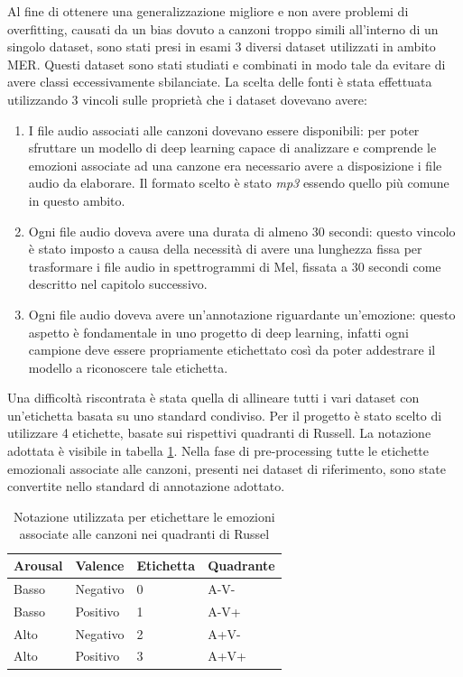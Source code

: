 \documentclass[11pt]{report}
\begin{document}
Al fine di ottenere una generalizzazione migliore e non avere problemi di overfitting, causati da un bias dovuto a canzoni troppo simili all'interno di un singolo dataset, sono stati presi in esami 3 diversi dataset utilizzati in ambito MER. Questi dataset sono stati studiati e combinati in modo tale da evitare di avere classi eccessivamente sbilanciate. La scelta delle fonti è stata effettuata utilizzando 3 vincoli sulle proprietà che i dataset dovevano avere:
\begin{enumerate}

    \item I file audio associati alle canzoni dovevano essere disponibili: per poter sfruttare un modello di deep learning capace di analizzare e comprende le emozioni associate ad una canzone era necessario avere a disposizione i file audio da elaborare. Il formato scelto è stato \textit{mp3} essendo quello più comune in questo ambito.
    
    \item Ogni file audio doveva avere una durata di almeno 30 secondi: questo vincolo è stato imposto a causa della necessità di avere una lunghezza fissa per trasformare i file audio in spettrogrammi di Mel, fissata a 30 secondi come descritto nel capitolo successivo.
    
    \item Ogni file audio doveva avere un'annotazione riguardante un'emozione: questo aspetto è fondamentale in uno progetto di deep learning, infatti ogni campione deve essere propriamente etichettato così da poter addestrare il modello a riconoscere tale etichetta.
    
\end{enumerate}



Una difficoltà riscontrata è stata quella di allineare tutti i vari dataset con un'etichetta basata su uno standard condiviso. Per il progetto è stato scelto di utilizzare 4 etichette, basate sui rispettivi quadranti di Russell. La notazione adottata è visibile in tabella \ref{tab1}. Nella fase di pre-processing tutte le etichette emozionali associate alle canzoni, presenti nei dataset di riferimento, sono state convertite nello standard di annotazione adottato.

\newpage

\begin{table}
\caption{Notazione utilizzata per etichettare le emozioni associate alle canzoni nei quadranti di Russel}
\label{tab1}
\centering
\begin{tabular}{|l|l|l|l|}
\hline
\textbf{Arousal} &  \textbf{Valence} & \textbf{Etichetta} & \textbf{Quadrante}\\
\hline
Basso &  Negativo & 0 & A-V-\\
Basso & Positivo & 1 & A-V+\\
Alto & Negativo & 2 & A+V-\\
Alto & Positivo & 3 & A+V+\\
\hline
\end{tabular}
\end{table}
\end{document}
